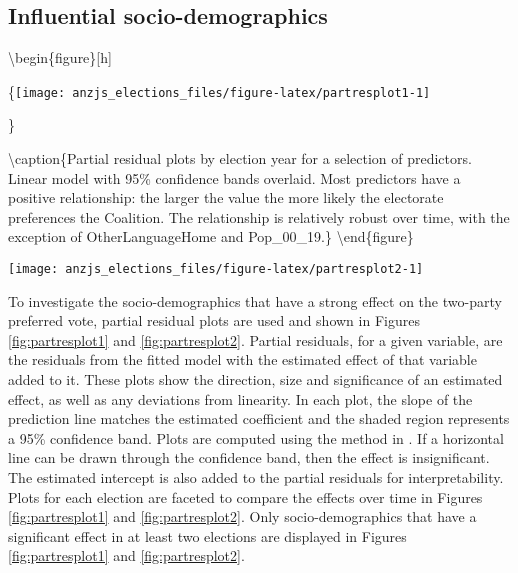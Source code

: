 \documentclass[times, doublespace]{anzsauth}
\let\origfigure\figure
\let\endorigfigure\endfigure
\renewenvironment{figure}[1][2] {
    \expandafter\origfigure\expandafter[htbp]
} {
    \endorigfigure
}
\begin{document}
\hypertarget{influential-socio-demographics}{%
\subsection{Influential socio-demographics}\label{influential-socio-demographics}}

\textbackslash begin\{figure\}{[}h{]}

\{\centering \texttt{[image: anzjs\_elections\_files/figure-latex/partresplot1-1]}

\}

\textbackslash caption\{Partial residual plots by election year for a selection of predictors. Linear model with 95\% confidence bands overlaid. Most predictors have a positive relationship: the larger the value the more likely the electorate preferences the Coalition. The relationship is relatively robust over time, with the exception of OtherLanguageHome and Pop\_00\_19.\}\label{fig:partresplot1}
\textbackslash end\{figure\}

\begin{figure}[h]

{\centering \texttt{[image: anzjs\_elections\_files/figure-latex/partresplot2-1]} 

}

\caption{Partial residual plots by election year for a selection of predictors. Linear model with 95\% confidence bands overlaid. Several predictors have a negative relationship: with larger values indicating the electorate more likely preferences Labor. Most relationships are relatively stable over elections, except Unemployment and Education.}\label{fig:partresplot2}
\end{figure}

To investigate the socio-demographics that have a strong effect on the two-party preferred vote, partial residual plots are used and shown in Figures \ref{fig:partresplot1} and \ref{fig:partresplot2}. Partial residuals, for a given variable, are the residuals from the fitted model with the estimated effect of that variable added to it. These plots show the direction, size and significance of an estimated effect, as well as any deviations from linearity. In each plot, the slope of the prediction line matches the estimated coefficient and the shaded region represents a 95\% confidence band. Plots are computed using the method in \citet{visreg}. If a horizontal line can be drawn through the confidence band, then the effect is insignificant. The estimated intercept is also added to the partial residuals for interpretability. Plots for each election are faceted to compare the effects over time in Figures \ref{fig:partresplot1} and \ref{fig:partresplot2}. Only socio-demographics that have a significant effect in at least two elections are displayed in Figures \ref{fig:partresplot1} and \ref{fig:partresplot2}.
\end{document}

